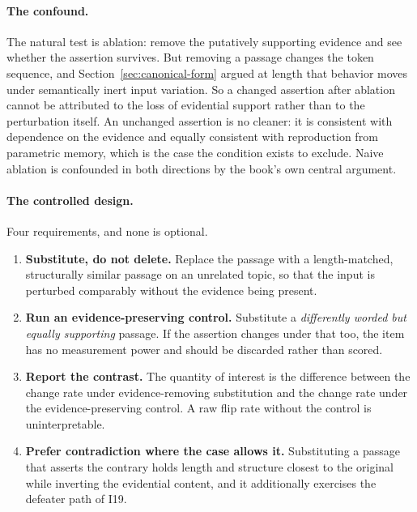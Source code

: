 \paragraph{The confound.} The natural test is ablation: remove the putatively
supporting evidence and see whether the assertion survives. But removing a passage
changes the token sequence, and Section~\ref{sec:canonical-form} argued at length that
behavior moves under semantically inert input variation. So a changed assertion after
ablation cannot be attributed to the loss of evidential support rather than to the
perturbation itself. An unchanged assertion is no cleaner: it is consistent with
dependence on the evidence and equally consistent with reproduction from parametric
memory, which is the case the condition exists to exclude. Naive ablation is confounded
in both directions by the book's own central argument.

\paragraph{The controlled design.} Four requirements, and none is optional.

\begin{enumerate}
  \item \textbf{Substitute, do not delete.} Replace the passage with a length-matched,
        structurally similar passage on an unrelated topic, so that the input is
        perturbed comparably without the evidence being present.
  \item \textbf{Run an evidence-preserving control.} Substitute a \emph{differently
        worded but equally supporting} passage. If the assertion changes under that
        too, the item has no measurement power and should be discarded rather than
        scored.
  \item \textbf{Report the contrast.} The quantity of interest is the difference
        between the change rate under evidence-removing substitution and the change
        rate under the evidence-preserving control. A raw flip rate without the
        control is uninterpretable.
  \item \textbf{Prefer contradiction where the case allows it.} Substituting a passage
        that asserts the contrary holds length and structure closest to the original
        while inverting the evidential content, and it additionally exercises the
        defeater path of I19.
\end{enumerate}

